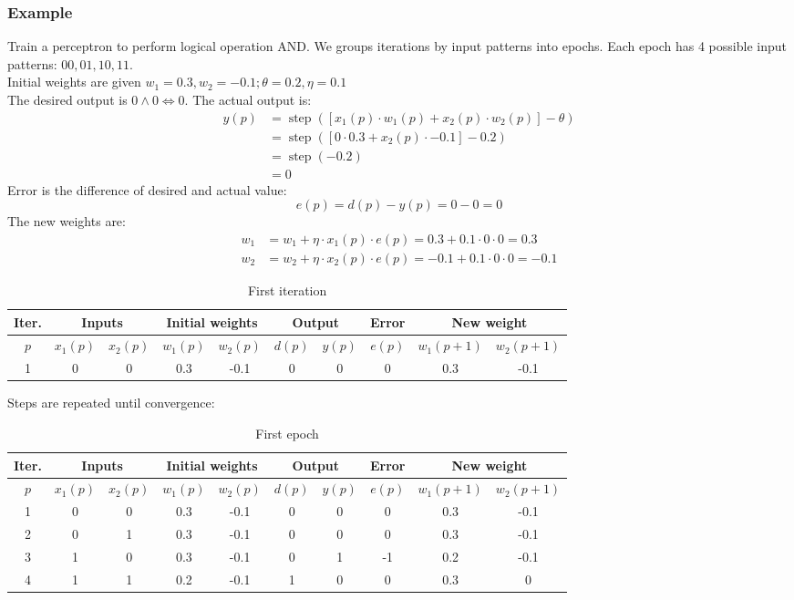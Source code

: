 \documentclass[a4paper,12pt,answers]{article}
\DeclareMathOperator*{\step}{step}
\newcommand{\stepfn}[1]{\step\left( #1 \right) }
\begin{document}
	\subsubsection{Example}
	Train a perceptron to perform logical operation AND. We groups iterations by input patterns into epochs. Each epoch has 4 possible input patterns: $00, 01, 10, 11$.
	\\[4pt]
	\noindent
	Initial weights are given $w_1 = 0.3, w_2 = -0.1; \theta=0.2, \eta=0.1$
	\\[8pt]
	\noindent
	The desired output is $0 \land 0 \iff 0$. The actual output is:
	\begin{align*}
		y(p) &= \stepfn{\left[ x_1(p) \cdot w_1(p) + x_2(p) \cdot w_2(p) \right] - \theta} \\
		&= \stepfn{\left[ 0 \cdot 0.3 + x_2(p) \cdot -0.1 \right] - 0.2} \\
		&= \stepfn{-0.2} \\
		&= 0
	\end{align*}
	Error is the difference of desired and actual value:
	\[
	e(p) = d(p) - y(p) = 0 - 0 = 0
	\]
	The new weights are:
	\begin{align*}
		w_1 &= w_1 + \eta \cdot x_1(p) \cdot e(p) = 0.3 + 0.1 \cdot 0 \cdot 0 = 0.3 \\
		w_2 &= w_2 + \eta \cdot x_2(p) \cdot e(p) = -0.1 + 0.1 \cdot 0 \cdot 0 = -0.1
	\end{align*}
	\begin{table}[H]
		\centering
		\begin{tabular}{|c|c|c|c|c|c|c|c|c|c|}
			\hline
			Iter. & \multicolumn{2}{c|}{Inputs} & \multicolumn{2}{c|}{Initial weights} & \multicolumn{2}{c|}{Output} & Error & \multicolumn{2}{c|}{New weight} \\
			\hline
			$p$ & $x_1(p)$ & $x_2(p)$ & $w_1(p)$ & $w_2(p)$ &$d(p)$ & $y(p)$ & $e(p)$ & $w_1(p+1)$ & $w_2(p+1)$ \\ \hline
			1 & 0 & 0 & 0.3 & -0.1 & 0 & 0 & 0 & 0.3 & -0.1 \\
			\hline
		\end{tabular}
		\caption{First iteration}
	\end{table}
	Steps are repeated until convergence:
	\begin{table}[H]
		\centering
		\begin{tabular}{|c|c|c|c|c|c|c|c|c|c|}
			\hline
			Iter. & \multicolumn{2}{c|}{Inputs} & \multicolumn{2}{c|}{Initial weights} & \multicolumn{2}{c|}{Output} & Error & \multicolumn{2}{c|}{New weight} \\
			\hline
			$p$ & $x_1(p)$ & $x_2(p)$ & $w_1(p)$ & $w_2(p)$ &$d(p)$ & $y(p)$ & $e(p)$ & $w_1(p+1)$ & $w_2(p+1)$ \\ \hline
			1 & 0 & 0 & 0.3 & -0.1 & 0 & 0 & 0 & 0.3 & -0.1 \\
			2 & 0 & 1 & 0.3 & -0.1 & 0 & 0 & 0 & 0.3 & -0.1 \\
			3 & 1 & 0 & 0.3 & -0.1 & 0 & 1 & -1& 0.2 & -0.1 \\
			4 & 1 & 1 & 0.2 & -0.1 & 1 & 0 & 0 & 0.3 &  0 \\
			\hline
		\end{tabular}
		\caption{First epoch}
	\end{table}
	
\end{document}
